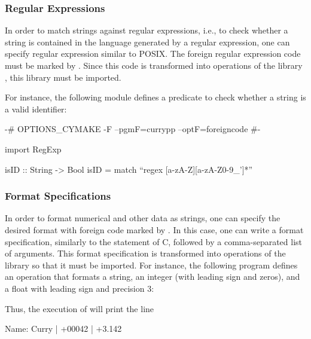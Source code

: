 \subsubsection{Regular Expressions}

In order to match strings against regular expressions, i.e.,
to check whether a string is contained in the language
generated by a regular expression, one can specify
regular expression similar to POSIX. The foreign regular
expression code must be marked by .
Since this code is transformed into operations of the \CYS library
, this library must be imported.

For instance, the following module defines a predicate
to check whether a string is a valid identifier:

\begin{curry}
{-# OPTIONS_CYMAKE -F --pgmF=currypp --optF=foreigncode #-}

import RegExp

isID :: String -> Bool
isID = match ``regex [a-zA-Z][a-zA-Z0-9_']*''
\end{curry}


\subsubsection{Format Specifications}

In order to format numerical and other data as strings,
one can specify the desired format with foreign code marked by
. In this case, one can write a format specification,
similarly to the  statement of C,
followed by a comma-separated list of arguments.
This format specification is transformed into operations
of the \CYS library  so that it must be imported.
For instance, the following program defines an operation
that formats a string, an integer (with leading sign and zeros),
and a float with leading sign and precision 3:
Thus, the execution of  will print the line
\begin{curry}
Name: Curry | +00042 | +3.142
\end{curry}

